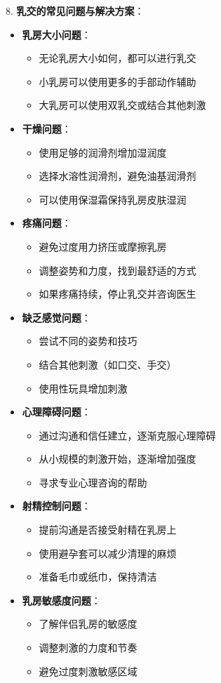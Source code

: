 \documentclass[12pt,UTF8]{ctexbook}
\begin{document}
8. \textbf{乳交的常见问题与解决方案}：
\begin{itemize}
	\item \textbf{乳房大小问题}：
	\begin{itemize}
		\item 无论乳房大小如何，都可以进行乳交
		\item 小乳房可以使用更多的手部动作辅助
		\item 大乳房可以使用双乳交或结合其他刺激
	\end{itemize}
	\item \textbf{干燥问题}：
	\begin{itemize}
		\item 使用足够的润滑剂增加湿润度
		\item 选择水溶性润滑剂，避免油基润滑剂
		\item 可以使用保湿霜保持乳房皮肤湿润
	\end{itemize}
	\item \textbf{疼痛问题}：
	\begin{itemize}
		\item 避免过度用力挤压或摩擦乳房
		\item 调整姿势和力度，找到最舒适的方式
		\item 如果疼痛持续，停止乳交并咨询医生
	\end{itemize}
	\item \textbf{缺乏感觉问题}：
	\begin{itemize}
		\item 尝试不同的姿势和技巧
		\item 结合其他刺激（如口交、手交）
		\item 使用性玩具增加刺激
	\end{itemize}
	\item \textbf{心理障碍问题}：
	\begin{itemize}
		\item 通过沟通和信任建立，逐渐克服心理障碍
		\item 从小规模的刺激开始，逐渐增加强度
		\item 寻求专业心理咨询的帮助
	\end{itemize}
	\item \textbf{射精控制问题}：
	\begin{itemize}
		\item 提前沟通是否接受射精在乳房上
		\item 使用避孕套可以减少清理的麻烦
		\item 准备毛巾或纸巾，保持清洁
	\end{itemize}
	\item \textbf{乳房敏感度问题}：
	\begin{itemize}
		\item 了解伴侣乳房的敏感度
		\item 调整刺激的力度和节奏
		\item 避免过度刺激敏感区域
	\end{itemize}
\end{itemize}
\end{document}
